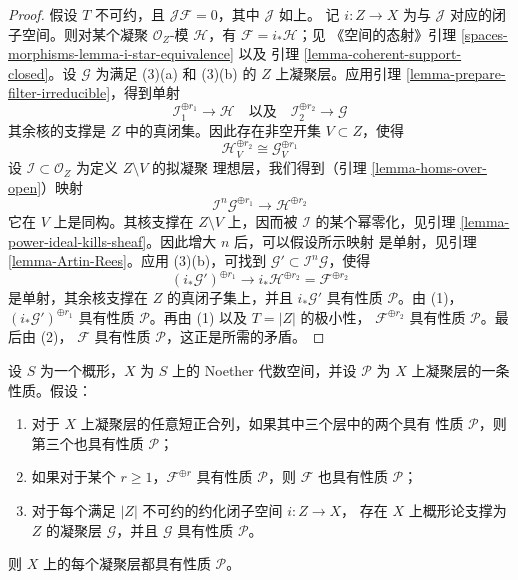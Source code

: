 \begin{proof}
\medskip\noindent
假设 $T$ 不可约，且 $\mathcal{J}\mathcal{F} = 0$，其中 $\mathcal{J}$ 如上。
记 $i : Z \to X$ 为与 $\mathcal{J}$ 对应的闭子空间。则对某个凝聚
$\mathcal{O}_Z$-模 $\mathcal{H}$，有 $\mathcal{F} = i_*\mathcal{H}$；见
《空间的态射》引理 \ref{spaces-morphisms-lemma-i-star-equivalence} 以及
引理 \ref{lemma-coherent-support-closed}。设 $\mathcal{G}$ 为满足
(3)(a) 和 (3)(b) 的 $Z$ 上凝聚层。应用引理
\ref{lemma-prepare-filter-irreducible}，得到单射
$$
\mathcal{I}_1^{\oplus r_1} \to \mathcal{H}
\quad\text{以及}\quad
\mathcal{I}_2^{\oplus r_2} \to \mathcal{G}
$$
其余核的支撑是 $Z$ 中的真闭集。因此存在非空开集 $V \subset Z$，使得
$$
\mathcal{H}^{\oplus r_2}_V \cong \mathcal{G}^{\oplus r_1}_V
$$
设 $\mathcal{I} \subset \mathcal{O}_Z$ 为定义 $Z \setminus V$ 的拟凝聚
理想层，我们得到（引理 \ref{lemma-homs-over-open}）映射
$$
\mathcal{I}^n\mathcal{G}^{\oplus r_1} \longrightarrow \mathcal{H}^{\oplus r_2}
$$
它在 $V$ 上是同构。其核支撑在 $Z \setminus V$ 上，因而被
$\mathcal{I}$ 的某个幂零化，见引理
\ref{lemma-power-ideal-kills-sheaf}。因此增大 $n$ 后，可以假设所示映射
是单射，见引理 \ref{lemma-Artin-Rees}。应用 (3)(b)，可找到
$\mathcal{G}' \subset \mathcal{I}^n\mathcal{G}$，使得
$$
(i_*\mathcal{G}')^{\oplus r_1} \longrightarrow
i_*\mathcal{H}^{\oplus r_2} = \mathcal{F}^{\oplus r_2}
$$
是单射，其余核支撑在 $Z$ 的真闭子集上，并且 $i_*\mathcal{G}'$ 具有性质
$\mathcal{P}$。由 (1)，$(i_*\mathcal{G}')^{\oplus r_1}$ 具有性质
$\mathcal{P}$。再由 (1) 以及 $T = |Z|$ 的极小性，
$\mathcal{F}^{\oplus r_2}$ 具有性质 $\mathcal{P}$。最后由 (2)，
$\mathcal{F}$ 具有性质 $\mathcal{P}$，这正是所需的矛盾。
\end{proof}

\begin{lemma}
\label{lemma-property-higher-rank-cohomological-variant}
设 $S$ 为一个概形，$X$ 为 $S$ 上的 Noether 代数空间，并设
$\mathcal{P}$ 为 $X$ 上凝聚层的一条性质。假设：
\begin{enumerate}
\item 对于 $X$ 上凝聚层的任意短正合列，如果其中三个层中的两个具有
性质 $\mathcal{P}$，则第三个也具有性质 $\mathcal{P}$；
\item 如果对于某个 $r \geq 1$，$\mathcal{F}^{\oplus r}$ 具有性质
$\mathcal{P}$，则 $\mathcal{F}$ 也具有性质 $\mathcal{P}$；
\item 对于每个满足 $|Z|$ 不可约的约化闭子空间 $i : Z \to X$，
存在 $X$ 上概形论支撑为 $Z$ 的凝聚层 $\mathcal{G}$，并且
$\mathcal{G}$ 具有性质 $\mathcal{P}$。
\end{enumerate}
则 $X$ 上的每个凝聚层都具有性质 $\mathcal{P}$。
\end{lemma}

